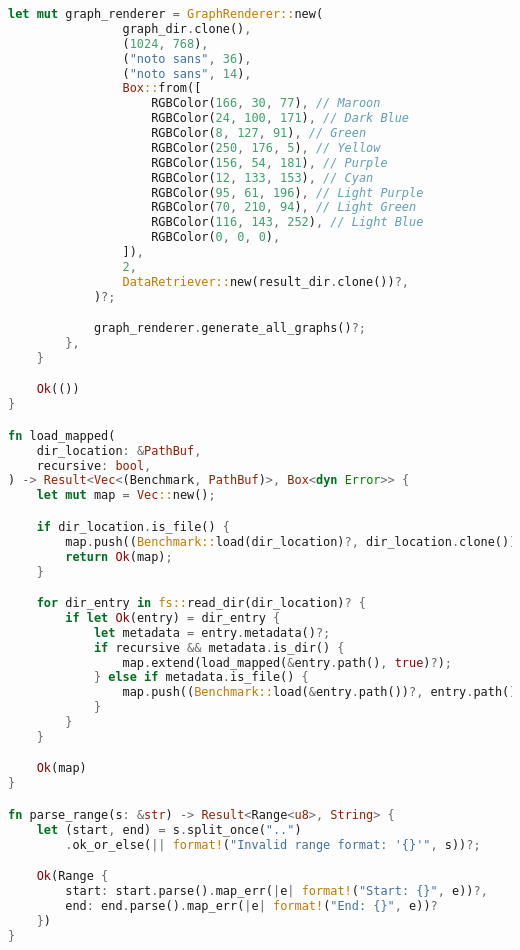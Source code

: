 \begin{lstlisting}[language=rust, caption={main.rs}]
			let mut graph_renderer = GraphRenderer::new(
				graph_dir.clone(),
				(1024, 768),
				("noto sans", 36),
				("noto sans", 14),
				Box::from([
					RGBColor(166, 30, 77), // Maroon
					RGBColor(24, 100, 171), // Dark Blue
					RGBColor(8, 127, 91), // Green
					RGBColor(250, 176, 5), // Yellow
					RGBColor(156, 54, 181), // Purple
					RGBColor(12, 133, 153), // Cyan
					RGBColor(95, 61, 196), // Light Purple
					RGBColor(70, 210, 94), // Light Green
					RGBColor(116, 143, 252), // Light Blue
					RGBColor(0, 0, 0),
				]),
				2,
				DataRetriever::new(result_dir.clone())?,
			)?;

			graph_renderer.generate_all_graphs()?;
		},
	}

	Ok(())
}

fn load_mapped(
	dir_location: &PathBuf,
	recursive: bool,
) -> Result<Vec<(Benchmark, PathBuf)>, Box<dyn Error>> {
	let mut map = Vec::new();

	if dir_location.is_file() {
		map.push((Benchmark::load(dir_location)?, dir_location.clone()));
		return Ok(map);
	}

	for dir_entry in fs::read_dir(dir_location)? {
		if let Ok(entry) = dir_entry {
			let metadata = entry.metadata()?;
			if recursive && metadata.is_dir() {
				map.extend(load_mapped(&entry.path(), true)?);
			} else if metadata.is_file() {
				map.push((Benchmark::load(&entry.path())?, entry.path()));
			}
		}
	}

	Ok(map)
}

fn parse_range(s: &str) -> Result<Range<u8>, String> {
	let (start, end) = s.split_once("..")
		.ok_or_else(|| format!("Invalid range format: '{}'", s))?;

	Ok(Range {
		start: start.parse().map_err(|e| format!("Start: {}", e))?,
		end: end.parse().map_err(|e| format!("End: {}", e))?
	})
}
\end{lstlisting}

